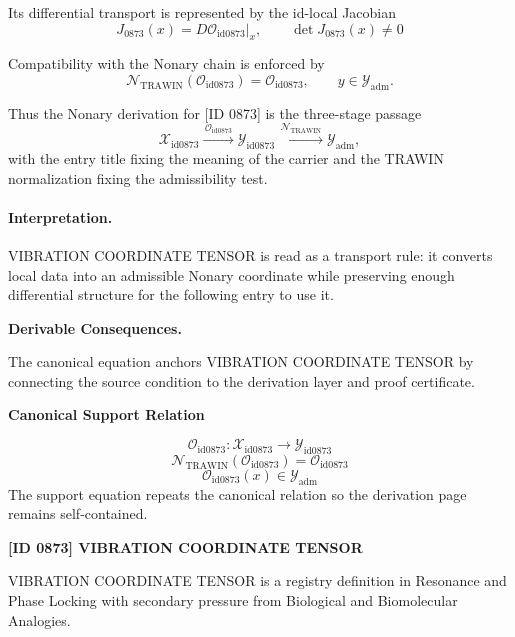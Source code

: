 Its differential transport is represented by the id-local Jacobian\[
J_{0873}(x)=D\mathcal{O}_{\mathrm{id0873}}\big|_x,\qquad \det J_{0873}(x)\neq 0
\]

Compatibility with the Nonary chain is enforced by\[
\mathcal{N}_{\mathrm{TRAWIN}}(\mathcal{O}_{\mathrm{id0873}})=\mathcal{O}_{\mathrm{id0873}},\qquad y\in\mathcal{Y}_{\mathrm{adm}}.
\]

Thus the Nonary derivation for [ID 0873] is the three-stage passage
\[
\mathcal{X}_{\mathrm{id0873}}\xrightarrow{\,\mathcal{O}_{\mathrm{id0873}}\,} \mathcal{Y}_{\mathrm{id0873}}\xrightarrow{\,\mathcal{N}_{\mathrm{TRAWIN}}\,} \mathcal{Y}_{\mathrm{adm}},
\]
with the entry title fixing the meaning of the carrier and the TRAWIN normalization fixing the admissibility test.

\paragraph{Interpretation.} VIBRATION COORDINATE TENSOR is read as a transport rule: it converts local data into an admissible Nonary coordinate while preserving enough differential structure for the following entry to use it.

\par\vspace{0.35em}
\noindent\textbf{Derivable Consequences.}\quad
\begingroup
\footnotesize
\raggedright
The canonical equation anchors VIBRATION COORDINATE TENSOR by connecting the source condition to the derivation layer and proof certificate.
\par\endgroup

\noindent\textbf{Canonical Support Relation}\par
\[
\mathcal{O}_{\mathrm{id0873}}:\mathcal{X}_{\mathrm{id0873}}\longrightarrow\mathcal{Y}_{\mathrm{id0873}}
\]
\[
\mathcal{N}_{\mathrm{TRAWIN}}(\mathcal{O}_{\mathrm{id0873}})=\mathcal{O}_{\mathrm{id0873}}
\]
\[
\mathcal{O}_{\mathrm{id0873}}(x)\in\mathcal{Y}_{\mathrm{adm}}
\]
\noindent The support equation repeats the canonical relation so the derivation page remains self-contained.\par

\clearpage
\noindent\textbf{[ID 0873] VIBRATION COORDINATE TENSOR}\par
\vspace{0.35em}
\begingroup\small
{}
VIBRATION COORDINATE TENSOR is a registry definition in Resonance and Phase Locking with secondary pressure from Biological and Biomolecular Analogies.

